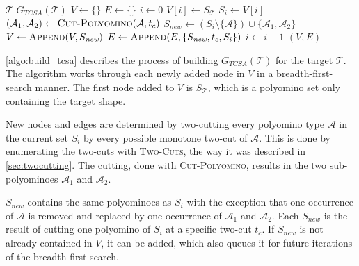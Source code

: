 \begin{algorithm}
	\caption{$\text{\scshape Build-TCSA-Graph}$}
	\label{algo:build_tcsa}
	\begin{algorithmic}[1]
		\REQUIRE $\mathcal{T}$ 
		\ENSURE $G_{\textit{TCSA}}(\mathcal{T})$  
		\STATE $V \gets \{\}$
		\STATE $E \gets \{\}$
		\STATE $i \gets 0$
		\STATE $V[i] \gets S_\mathcal{T}$ 
			\STATE $S_i \gets V[i]$
					\STATE $(\mathcal{A}_1, \mathcal{A}_2) \gets \text{\scshape Cut-Polyomino}(\mathcal{A}, t_c)$
					\STATE $S_\textit{new} \gets \left( S_i \setminus \{\mathcal{A}\} \right) \cup \{\mathcal{A}_1, \mathcal{A}_2\}$ 
						\STATE $V \gets \text{\scshape Append}(V, S_\textit{new})$
					\ENDIF
					\STATE $E \gets \text{\scshape Append}(E, \{S_\textit{new}, t_c, S_i\})$
				\ENDFOR
			\ENDFOR
			\STATE $i \gets i+1$
		\ENDWHILE
		\RETURN $(V,E)$
	\end{algorithmic}
\end{algorithm}

\autoref{algo:build_tcsa} describes the process of building $G_{\textit{TCSA}}(\mathcal{T})$ for the target $\mathcal{T}$.
The algorithm works through each newly added node in $V$ in a breadth-first-search manner.
The first node added to $V$ is $S_\mathcal{T}$, which is a polyomino set only containing the target shape.

New nodes and edges are determined by two-cutting every polyomino type $\mathcal{A}$ in the current set $S_i$ by every possible monotone two-cut of $\mathcal{A}$.
This is done by enumerating the two-cuts with {\scshape Two-Cuts}, the way it was described in \autoref{sec:twocutting}.
The cutting, done with {\scshape Cut-Polyomino}, results in the two sub-polyominoes $\mathcal{A}_1$ and $\mathcal{A}_2$.

$S_\textit{new}$ contains the same polyominoes as $S_i$ with the exception that one occurrence of $\mathcal{A}$ is removed and replaced by one occurrence of $\mathcal{A}_1$ and $\mathcal{A}_2$.
Each $S_\textit{new}$ is the result of cutting one polyomino of $S_i$ at a specific two-cut $t_c$.
If $S_\textit{new}$ is not already contained in $V$, it can be added, which also queues it for future iterations of the breadth-first-search.

